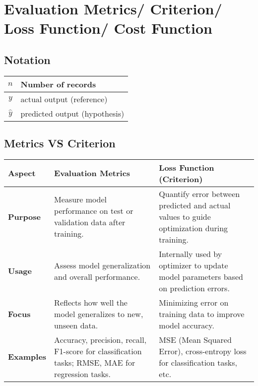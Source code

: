 \chapter{Evaluation Metrics/ Criterion/ Loss Function/ Cost Function}

\section*{Notation}
\begin{table}[h]
    \centering
    \begin{tabular}{|c|l|}
        \hline
        
       $n$  & Number of records \\ 
       \hline
       
       $y$ & actual output (reference) \\ 
       \hline
       
       $\hat{y}$ & predicted output (hypothesis) \\ 
       \hline 
       
    \end{tabular}
\end{table}

\section*{Metrics VS Criterion}
\begin{table}[h]
    \centering
    \begin{tabular}{|p{2cm}|p{6cm}|p{6cm}|}
        \hline
        
        \textbf{Aspect} & \textbf{Evaluation Metrics} & \textbf{Loss Function (Criterion)} \\
        \hline
        
        \textbf{Purpose} & Measure model performance on test or validation data after training. & Quantify error between predicted and actual values to guide optimization during training. \\
        \hline
        
        \textbf{Usage} & Assess model generalization and overall performance. & Internally used by optimizer to update model parameters based on prediction errors. \\
        \hline
        
        \textbf{Focus} & Reflects how well the model generalizes to new, unseen data. & Minimizing error on training data to improve model accuracy. \\
        \hline

        \textbf{Examples} & Accuracy, precision, recall, F1-score for classification tasks; RMSE, MAE for regression tasks. & MSE (Mean Squared Error), cross-entropy loss for classification tasks, etc. \\
        \hline
    \end{tabular}
\end{table}

